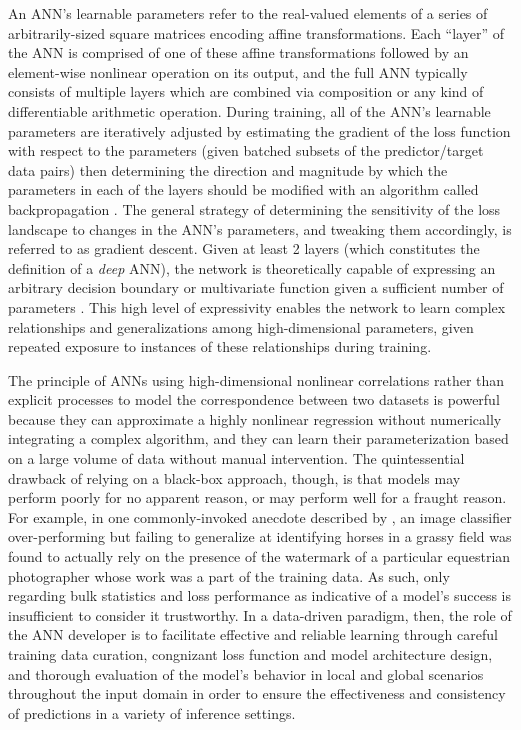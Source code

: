 An ANN's learnable parameters refer to the real-valued elements of a series of arbitrarily-sized square matrices encoding affine transformations. Each ``layer'' of the ANN is comprised of one of these affine transformations followed by an element-wise nonlinear operation on its output, and the full ANN typically consists of multiple layers which are combined via composition or any kind of differentiable arithmetic operation. During training, all of the ANN's learnable parameters are iteratively adjusted by estimating the gradient of the loss function with respect to the parameters (given batched subsets of the predictor/target data pairs) then determining the direction and magnitude by which the parameters in each of the layers should be modified with an algorithm called backpropagation \citep{rumelhart_learning_1986}. The general strategy of determining the sensitivity of the loss landscape to changes in the ANN's parameters, and tweaking them accordingly, is referred to as gradient descent. Given at least 2 layers (which constitutes the definition of a \textit{deep} ANN), the network is theoretically capable of expressing an arbitrary decision boundary or multivariate function given a sufficient number of parameters \citep{hornik_multilayer_1989}. This high level of expressivity enables the network to learn complex relationships and generalizations among high-dimensional parameters, given repeated exposure to instances of these relationships during training.

The principle of ANNs using high-dimensional nonlinear correlations rather than explicit processes to model the correspondence between two datasets is powerful because they can approximate a highly nonlinear regression without numerically integrating a complex algorithm, and they can learn their parameterization based on a large volume of data without manual intervention. The quintessential drawback of relying on a black-box approach, though, is that models may perform poorly for no apparent reason, or may perform well for a fraught reason. For example, in one commonly-invoked anecdote described by \citep{lapuschkin_unmasking_2019}, an image classifier over-performing but failing to generalize at identifying horses in a grassy field was found to actually rely on the presence of the watermark of a particular equestrian photographer whose work was a part of the training data. As such, only regarding bulk statistics and loss performance as indicative of a model's success is insufficient to consider it trustworthy. In a data-driven paradigm, then, the role of the ANN developer is to facilitate effective and reliable learning through careful training data curation, congnizant loss function and model architecture design, and thorough evaluation of the model's behavior in local and global scenarios throughout the input domain in order to ensure the effectiveness and consistency of predictions in a variety of inference settings.

